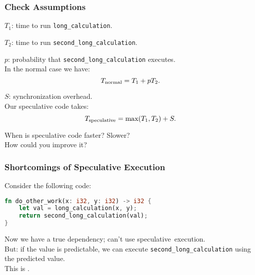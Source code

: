 \begin{frame}
\frametitle{Check Assumptions}
  
  $T_1$: time to run {\tt long\_calculation}.

  $T_2$: time to run {\tt second\_long\_calculation}.

  $p$: probability that {\tt second\_long\_calculation} executes.\\[1em]

  In the normal case we have:
    \[T_{\mbox{\scriptsize normal}} = T_1 + pT_2.\]

  $S$: synchronization overhead.\\
  Our speculative code takes:
    \[ T_{\mbox{\scriptsize speculative}} = \mbox{max}(T_1, T_2) + S.\]

     When is speculative code faster? Slower? \\ How could you improve it?

  
\end{frame}

\begin{frame}[fragile]
  \frametitle{Shortcomings of Speculative Execution}

  
  Consider the following code:
  
\begin{lstlisting}[language=Rust]
fn do_other_work(x: i32, y: i32) -> i32 {
    let val = long_calculation(x, y);
    return second_long_calculation(val);
}
\end{lstlisting}

  Now we have a true dependency; can't use speculative~execution.\\[1em]

  But: if the value is predictable, we can execute
      {\tt second\_long\_calculation} using the predicted value.\\[1em]

  This is .
  
\end{frame}


